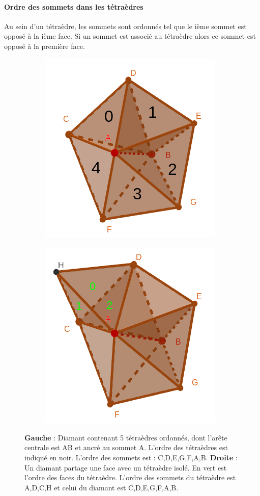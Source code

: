 \paragraph{Ordre des sommets dans les tétraèdres}
Au sein d'un tétraèdre, les sommets sont ordonnés tel que le ième sommet est opposé à la ième face. Si un sommet est associé au tétraèdre alors ce sommet est opposé à la première face.
\begin{figure}[H]
\centering
\begin{subfigure}{.5\textwidth}
  \centering
  \includegraphics[scale=0.34]{Images/tetra_ordonnee}
  \caption{}
  \label{fig:tetra_ordonnee}
\end{subfigure}%
\begin{subfigure}{.5\textwidth}
  \centering
  \includegraphics[scale=0.36]{Images/permutation_tetra_diamant}
  \caption{}
  \label{fig:permutation_tetra_diamant}
\end{subfigure}
\caption{\textbf{Gauche} : Diamant contenant 5 tétraèdres ordonnés, dont l'arête centrale est AB et ancré au sommet A. L'ordre des tétraèdres est indiqué en noir. L'ordre des sommets est : C,D,E,G,F,A,B. \textbf{Droite} : Un diamant partage une face avec un tétraèdre isolé. En vert est l'ordre des faces du tétraèdre. L'ordre des sommets du tétraèdre est A,D,C,H et celui du diamant est C,D,E,G,F,A,B.}
\end{figure}
